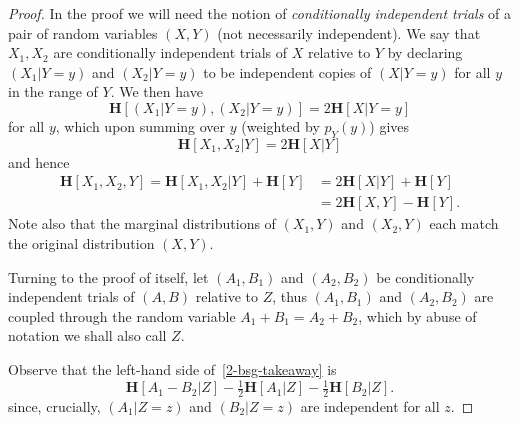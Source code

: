 \documentclass[12pt,reqno,tbtags]{amsart}
\theoremstyle{definition}
\theoremstyle{remark}
\newcommand{\ent}[1]{\mathbf{H}[#1]}
\numberwithin{equation}{section}
\begin{document}
\begin{proof}
In the proof we will need the notion of \emph{conditionally independent trials} of a pair of random variables $(X,Y)$ (not necessarily independent). We say that $X_1, X_2$ are conditionally independent trials of $X$ relative to $Y$ by declaring $(X_1 | Y = y)$ and $(X_2 | Y = y)$ to be independent copies of $(X | Y = y)$ for all $y$ in the range of $Y$.
We then have
\[ \ent{(X_1 | Y = y), (X_2 | Y = y)} = 2\ent{X | Y = y}\] for all $y$, which upon summing over $y$ (weighted by $p_Y(y)$) gives \[ \ent{X_1, X_2 | Y} = 2 \ent{X | Y}\] and hence
\begin{align}\nonumber
\ent{X_1, X_2, Y}  = \ent{X_1, X_2 | Y } + \ent{Y} & = 2 \ent{X | Y} + \ent{Y} \\ & = 2 \ent{X,Y} - \ent{Y}.\label{cond-trial-h}
\end{align}
Note also that the marginal distributions of $(X_1,Y)$ and $(X_2,Y)$ each match the original distribution $(X,Y)$.

Turning to the proof of  itself, let $(A_1, B_1)$ and $(A_2, B_2)$ be conditionally independent trials of $(A,B)$ relative to $Z$, thus $(A_1,B_1)$ and $(A_2,B_2)$ are coupled through the random variable $A_1 + B_1 = A_2 + B_2$, which by abuse of notation we shall also call $Z$.

Observe that the left-hand side of~\eqref{2-bsg-takeaway} is
\begin{equation}\label{lhs-to-bound}
\ent{A_1 - B_2| Z} - \tfrac{1}{2}\ent{A_1 | Z} - \tfrac{1}{2} \ent{B_2 | Z}.
\end{equation}
since, crucially, $(A_1 | Z=z)$ and $(B_2 | Z=z)$ are independent for all $z$.


\end{proof}
\end{document}
